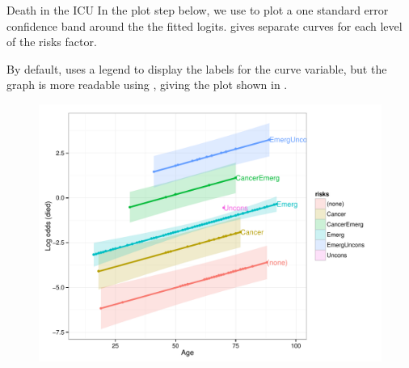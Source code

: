 \documentclass[11pt]{book}
\renewenvironment{knitrout}{\small\renewcommand{\baselinestretch}{.85}}{} %
\begin{document}
\begin{Example}[icu1]{Death in the ICU}
In the plot step below, we use  to plot a one standard
error confidence band around the the fitted logits. 
gives separate curves for each level of the risks factor.

\begin{knitrout}
\color{fgcolor}\begin{kframe}
\begin{alltt}
 \hlkwb{<-}  \hlstd{(}   \hlopt{+}
  \hlstd{(} \hlstd{=} \hlstd{)} \hlopt{+} \hlstd{()} \hlopt{+}
  \hlstd{(}\hlstd{(}  \hlopt{-} 
                    \hlopt{+} 
                   
               \hlstd{=} \hlstd{,}
               \hlstd{=} \hlstd{)} \hlopt{+}
  \hlstd{()} \hlopt{+}
  \hlstd{(} \hlstd{=} \hlstd{,}  \hlstd{=} \hlstd{)} \hlopt{+}
  \hlstd{(}\hlstd{=}\hlstd{)}
\end{alltt}
\end{kframe}
\end{knitrout}
By default,  uses a legend to display the labels for the curve
variable, but the graph is more readable using , 
giving the plot shown in .
\begin{knitrout}
\color{fgcolor}\begin{kframe}
\begin{alltt}
\hlopt{+}\hlstd{(}\hlstd{,}
\end{alltt}
\end{kframe}\begin{figure}[!htbp]


\centerline{\includegraphics[width=.75\textwidth]{ch07/fig/icu1-fit-plot} }


\end{figure}
\end{knitrout}
\end{Example}
\end{document}
